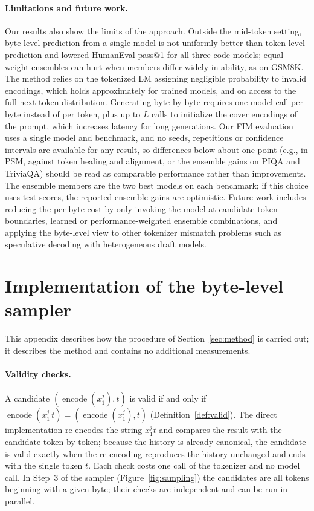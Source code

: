 \documentclass{article} %
\newcommand{\enc}{\operatorname{encode}}
\begin{document}
\paragraph{Limitations and future work.}
Our results also show the limits of the approach. Outside the mid-token setting, byte-level prediction from a single model is not uniformly better than token-level prediction and lowered HumanEval pass@1 for all three code models; equal-weight ensembles can hurt when members differ widely in ability, as on GSM8K. The method relies on the tokenized LM assigning negligible probability to invalid encodings, which holds approximately for trained models, and on access to the full next-token distribution. Generating byte by byte requires one model call per byte instead of per token, plus up to $L$ calls to initialize the cover encodings of the prompt, which increases latency for long generations. Our FIM evaluation uses a single model and benchmark, and no seeds, repetitions or confidence intervals are available for any result, so differences below about one point (e.g., in PSM, against token healing and alignment, or the ensemble gains on PIQA and TriviaQA) should be read as comparable performance rather than improvements. The ensemble members are the two best models on each benchmark; if this choice uses test scores, the reported ensemble gains are optimistic. Future work includes reducing the per-byte cost by only invoking the model at candidate token boundaries, learned or performance-weighted ensemble combinations, and applying the byte-level view to other tokenizer mismatch problems such as speculative decoding with heterogeneous draft models.




\appendix
\section{Implementation of the byte-level sampler}
\label{app:impl}
This appendix describes how the procedure of Section~\ref{sec:method} is carried out; it describes the method and contains no additional measurements.

\paragraph{Validity checks.} A candidate $(\enc(x_1^j), t)$ is valid if and only if $\enc(x_1^j\,t) = (\enc(x_1^j), t)$ (Definition~\ref{def:valid}). The direct implementation re-encodes the string $x_1^j t$ and compares the result with the candidate token by token; because the history is already canonical, the candidate is valid exactly when the re-encoding reproduces the history unchanged and ends with the single token $t$. Each check costs one call of the tokenizer and no model call. In Step~3 of the sampler (Figure~\ref{fig:sampling}) the candidates are all tokens beginning with a given byte; their checks are independent and can be run in parallel.
\end{document}
